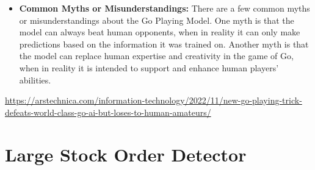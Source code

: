 \begin{itemize}
    \item \textbf{Common Myths or Misunderstandings:} There are a few common myths or misunderstandings about the Go Playing Model. One myth is that the model can always beat human opponents, when in reality it can only make predictions based on the information it was trained on. Another myth is that the model can replace human expertise and creativity in the game of Go, when in reality it is intended to support and enhance human players' abilities.
\end{itemize}

\url{https://arstechnica.com/information-technology/2022/11/new-go-playing-trick-defeats-world-class-go-ai-but-loses-to-human-amateurs/}

\section{Large Stock Order Detector}


